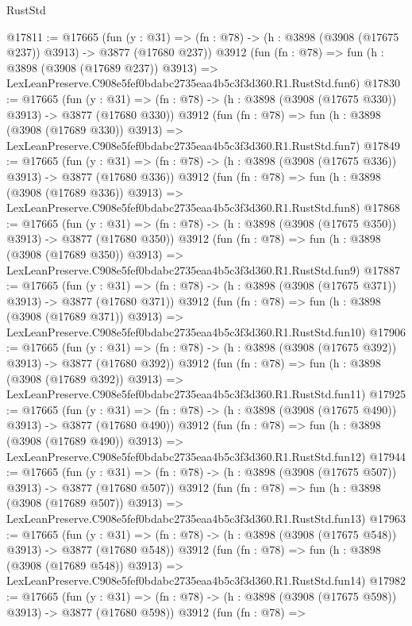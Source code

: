 \begin{lexlean}{RustStd}
\begin{coremodule}
@17811 := @17665
    (fun (y : @31) => (fn : @78) -> (h : @3898 (@3908 (@17675 @237)) @3913) -> @3877 (@17680 @237))
    @3912
    (fun (fn : @78) =>
    fun (h : @3898 (@3908 (@17689 @237)) @3913) =>
    LexLeanPreserve.C908e5fef0bdabc2735eaa4b5c3f3d360.R1.RustStd.fun6)
@17830 := @17665
    (fun (y : @31) => (fn : @78) -> (h : @3898 (@3908 (@17675 @330)) @3913) -> @3877 (@17680 @330))
    @3912
    (fun (fn : @78) =>
    fun (h : @3898 (@3908 (@17689 @330)) @3913) =>
    LexLeanPreserve.C908e5fef0bdabc2735eaa4b5c3f3d360.R1.RustStd.fun7)
@17849 := @17665
    (fun (y : @31) => (fn : @78) -> (h : @3898 (@3908 (@17675 @336)) @3913) -> @3877 (@17680 @336))
    @3912
    (fun (fn : @78) =>
    fun (h : @3898 (@3908 (@17689 @336)) @3913) =>
    LexLeanPreserve.C908e5fef0bdabc2735eaa4b5c3f3d360.R1.RustStd.fun8)
@17868 := @17665
    (fun (y : @31) => (fn : @78) -> (h : @3898 (@3908 (@17675 @350)) @3913) -> @3877 (@17680 @350))
    @3912
    (fun (fn : @78) =>
    fun (h : @3898 (@3908 (@17689 @350)) @3913) =>
    LexLeanPreserve.C908e5fef0bdabc2735eaa4b5c3f3d360.R1.RustStd.fun9)
@17887 := @17665
    (fun (y : @31) => (fn : @78) -> (h : @3898 (@3908 (@17675 @371)) @3913) -> @3877 (@17680 @371))
    @3912
    (fun (fn : @78) =>
    fun (h : @3898 (@3908 (@17689 @371)) @3913) =>
    LexLeanPreserve.C908e5fef0bdabc2735eaa4b5c3f3d360.R1.RustStd.fun10)
@17906 := @17665
    (fun (y : @31) => (fn : @78) -> (h : @3898 (@3908 (@17675 @392)) @3913) -> @3877 (@17680 @392))
    @3912
    (fun (fn : @78) =>
    fun (h : @3898 (@3908 (@17689 @392)) @3913) =>
    LexLeanPreserve.C908e5fef0bdabc2735eaa4b5c3f3d360.R1.RustStd.fun11)
@17925 := @17665
    (fun (y : @31) => (fn : @78) -> (h : @3898 (@3908 (@17675 @490)) @3913) -> @3877 (@17680 @490))
    @3912
    (fun (fn : @78) =>
    fun (h : @3898 (@3908 (@17689 @490)) @3913) =>
    LexLeanPreserve.C908e5fef0bdabc2735eaa4b5c3f3d360.R1.RustStd.fun12)
@17944 := @17665
    (fun (y : @31) => (fn : @78) -> (h : @3898 (@3908 (@17675 @507)) @3913) -> @3877 (@17680 @507))
    @3912
    (fun (fn : @78) =>
    fun (h : @3898 (@3908 (@17689 @507)) @3913) =>
    LexLeanPreserve.C908e5fef0bdabc2735eaa4b5c3f3d360.R1.RustStd.fun13)
@17963 := @17665
    (fun (y : @31) => (fn : @78) -> (h : @3898 (@3908 (@17675 @548)) @3913) -> @3877 (@17680 @548))
    @3912
    (fun (fn : @78) =>
    fun (h : @3898 (@3908 (@17689 @548)) @3913) =>
    LexLeanPreserve.C908e5fef0bdabc2735eaa4b5c3f3d360.R1.RustStd.fun14)
@17982 := @17665
    (fun (y : @31) => (fn : @78) -> (h : @3898 (@3908 (@17675 @598)) @3913) -> @3877 (@17680 @598))
    @3912
    (fun (fn : @78) =>

\end{coremodule}
\end{lexlean}
